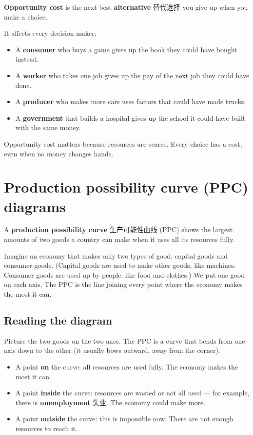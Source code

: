 \documentclass[11pt]{article}
\begin{document}
\textbf{Opportunity cost} is the next best \textbf{alternative} 替代选择 you give up when you make a choice.

It affects every decision-maker:

\begin{itemize}
\item A \textbf{consumer} who buys a game gives up the book they could have bought instead.

\item A \textbf{worker} who takes one job gives up the pay of the next job they could have done.

\item A \textbf{producer} who makes more cars uses factors that could have made trucks.

\item A \textbf{government} that builds a hospital gives up the school it could have built with the same money.

\end{itemize}

Opportunity cost matters because resources are scarce. Every choice has a cost, even when no money changes hands.

\section*{Production possibility curve (PPC) diagrams}

A \textbf{production possibility curve} 生产可能性曲线 (PPC) shows the largest amounts of two goods a country can make when it uses all its resources fully.

Imagine an economy that makes only two types of good: capital goods and consumer goods. (Capital goods are used to make other goods, like machines. Consumer goods are used up by people, like food and clothes.) We put one good on each axis. The PPC is the line joining every point where the economy makes the most it can.

\subsection*{Reading the diagram}

Picture the two goods on the two axes. The PPC is a curve that bends from one axis down to the other (it usually bows outward, away from the corner):

\begin{itemize}
\item A point \textbf{on} the curve: all resources are used fully. The economy makes the most it can.

\item A point \textbf{inside} the curve: resources are wasted or not all used — for example, there is \textbf{unemployment} 失业. The economy could make more.

\item A point \textbf{outside} the curve: this is impossible now. There are not enough resources to reach it.

\end{itemize}
\end{document}

